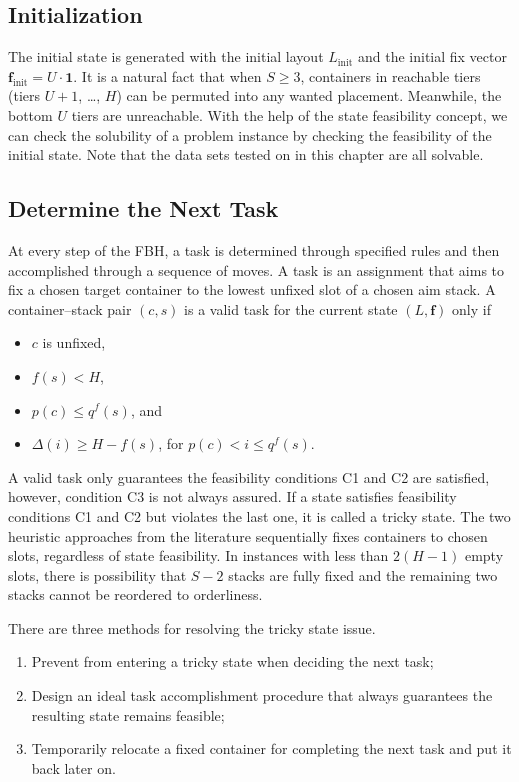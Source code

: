 \documentclass{article}
\begin{document}
\subsection{Initialization}

The initial state is generated with the initial layout $L_\mathrm{init}$ and the initial fix vector $\boldsymbol{f}_\mathrm{init}=U\cdot\boldsymbol{1}$. It is a natural fact that when $S\ge 3$, containers in reachable tiers (tiers $U+1$, \dots, $H$) can be permuted into any wanted placement. Meanwhile, the bottom $U$ tiers are unreachable.
With the help of the state feasibility concept, we can check the solubility of a problem instance by checking the feasibility of the initial state. Note that the data sets tested on in this chapter are all solvable.

\subsection{Determine the Next Task}

At every step of the FBH, a task is determined through specified rules and then accomplished through a sequence of moves. A task is an assignment that aims to fix a chosen target container to the lowest unfixed slot of a chosen aim stack.
A container--stack pair $(c,s)$ is a valid task for the current state $( L,\boldsymbol{f})$ only if 
\begin{itemize}[nosep]
\item $c$ is unfixed,
\item $f(s)<H$,
\item $p(c)\le q^f(s)$, and
\item $\Delta(i)\ge H-f(s)$, for $p(c)< i\le q^f(s)$.
\end{itemize}

A valid task only guarantees the feasibility conditions C1 and C2 are satisfied, however, condition C3 is not always assured.
If a state satisfies feasibility conditions C1 and C2 but violates the last one, it is called a tricky state.
The two heuristic approaches from the literature sequentially fixes containers to chosen slots, regardless of state feasibility. In instances with less than $2(H-1)$ empty slots, there is possibility that $S-2$ stacks are fully fixed and the remaining two stacks cannot be reordered to orderliness.

There are three methods for resolving the tricky state issue.
\begin{enumerate}[nosep]
\item Prevent from entering a tricky state when deciding the next task;
\item Design an ideal task accomplishment procedure that always guarantees the resulting  state remains feasible;
\item Temporarily relocate a fixed container for completing the next task and put it back later on.
\end{enumerate}
\end{document}
